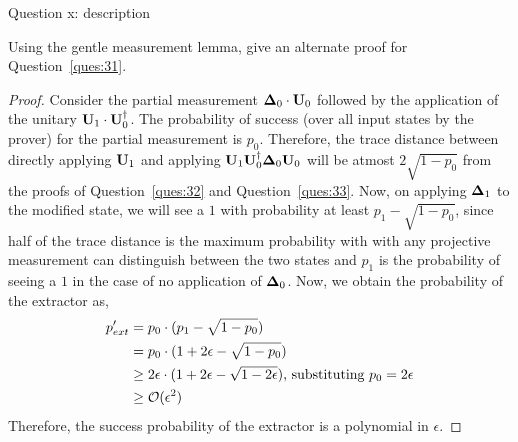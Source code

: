 \begin{solution}{Question x: description}\label{ques:34}
    \begin{question}
        Using the gentle measurement lemma, give an alternate proof for Question~\ref{ques:31}.
    \end{question}
    \tcblower{}
    \begin{proof}
        Consider the partial measurement $\mathbf{\Delta}_0\cdot\mathbf{U}_0$ followed by the application of the unitary $\mathbf{U}_1\cdot\mathbf{U}_0^\dagger$. The probability of success (over all input states by the prover) for the partial measurement is $p_0$. Therefore, the trace distance between directly applying $\mathbf{U}_1$ and applying $\mathbf{U}_1\mathbf{U}_0^\dagger\mathbf{\Delta}_0\mathbf{U}_0$ will be atmost $2\sqrt{1-p_0}$ from the proofs of Question~\ref{ques:32} and Question~\ref{ques:33}. Now, on applying $\mathbf{\Delta}_1$ to the modified state, we will see a $1$ with probability at least $p_1 - \sqrt{1-p_0}$, since half of the trace distance is the maximum probability with with any projective measurement can distinguish between the two states and $p_1$ is the probability of seeing a $1$ in the case of no application of $\mathbf{\Delta}_0$. Now, we obtain the probability of the extractor as,
        \begin{equation}
            \begin{split}
                p'_{ext} &= p_0\cdot(p_1 - \sqrt{1-p_0})\\
                &= p_0\cdot(1 + 2\epsilon - \sqrt{1 - p_0})\\
                &\geq 2\epsilon\cdot(1 + 2\epsilon - \sqrt{1 - 2\epsilon})\text{, substituting }p_0 = 2\epsilon\\
                &\geq \mathcal{O}(\epsilon^2)
            \end{split}
        \end{equation}
        Therefore, the success probability of the extractor is a polynomial in $\epsilon$.
    \end{proof}
\end{solution}
